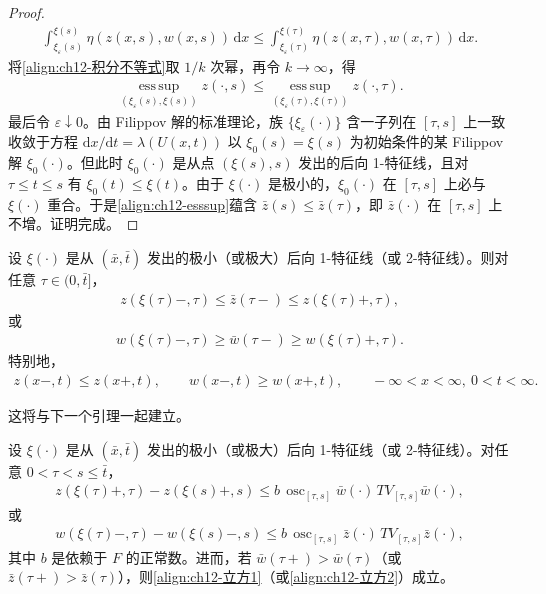 \documentclass[../../main.tex]{subfiles}
\begin{document}
\begin{proof}
\begin{align}
\int_{\xi_\varepsilon(s)}^{\xi(s)}\eta(z(x,s),w(x,s))\,\mathrm{d}x\leqslant\int_{\xi_\varepsilon(\tau)}^{\xi(\tau)}\eta(z(x,\tau),w(x,\tau))\,\mathrm{d}x.
\label{align:ch12-积分不等式}
\end{align}
将\eqref{align:ch12-积分不等式}取 $1/k$ 次幂，再令 $k\to\infty$，得
\begin{align}
\operatorname*{ess\,sup}_{(\xi_\varepsilon(s),\xi(s))}z(\cdot,s)\leqslant\operatorname*{ess\,sup}_{(\xi_\varepsilon(\tau),\xi(\tau))}z(\cdot,\tau).
\label{align:ch12-esssup}
\end{align}
最后令 $\varepsilon\downarrow0$。由 Filippov 解的标准理论，族 $\{\xi_\varepsilon(\cdot)\}$ 含一子列在 $[\tau,s]$ 上一致收敛于方程 $\mathrm{d}x/\mathrm{d}t=\lambda(U(x,t))$ 以 $\xi_0(s)=\xi(s)$ 为初始条件的某 Filippov 解 $\xi_0(\cdot)$。但此时 $\xi_0(\cdot)$ 是从点 $(\xi(s),s)$ 发出的后向 1-特征线，且对 $\tau\leqslant t\leqslant s$ 有 $\xi_0(t)\leqslant\xi(t)$。由于 $\xi(\cdot)$ 是极小的，$\xi_0(\cdot)$ 在 $[\tau,s]$ 上必与 $\xi(\cdot)$ 重合。于是\eqref{align:ch12-esssup}蕴含 $\bar z(s)\leqslant\bar z(\tau)$，即 $\bar z(\cdot)$ 在 $[\tau,s]$ 上不增。证明完成。
\end{proof}

\begin{lemma}\label{lemma:ch12-迹夹逼}
设 $\xi(\cdot)$ 是从 $(\bar x,\bar t)$ 发出的极小（或极大）后向 1-特征线（或 2-特征线）。则对任意 $\tau\in(0,\bar t]$，
\begin{align}
z(\xi(\tau)-,\tau)\leqslant\bar z(\tau-)\leqslant z(\xi(\tau)+,\tau),
\label{align:ch12-夹逼1}
\end{align}
或
\begin{align}
w(\xi(\tau)-,\tau)\geqslant\bar w(\tau-)\geqslant w(\xi(\tau)+,\tau).
\label{align:ch12-夹逼2}
\end{align}
特别地，
\begin{align}
z(x-,t)\leqslant z(x+,t),\qquad w(x-,t)\geqslant w(x+,t),\qquad -\infty<x<\infty,\ 0<t<\infty.
\label{align:ch12-左右极限}
\end{align}
\end{lemma}

这将与下一个引理一起建立。

\begin{lemma}\label{lemma:ch12-振荡估计}
设 $\xi(\cdot)$ 是从 $(\bar x,\bar t)$ 发出的极小（或极大）后向 1-特征线（或 2-特征线）。对任意 $0<\tau<s\leqslant\bar t$，
\begin{align}
z(\xi(\tau)+,\tau)-z(\xi(s)+,s)\leqslant b\,\operatorname{osc}_{[\tau,s]}\bar w(\cdot)\,TV_{[\tau,s]}\bar w(\cdot),
\label{align:ch12-振荡1}
\end{align}
或
\begin{align}
w(\xi(\tau)-,\tau)-w(\xi(s)-,s)\leqslant b\,\operatorname{osc}_{[\tau,s]}\bar z(\cdot)\,TV_{[\tau,s]}\bar z(\cdot),
\label{align:ch12-振荡2}
\end{align}
其中 $b$ 是依赖于 $F$ 的正常数。进而，若 $\bar w(\tau+)>\bar w(\tau)$（或 $\bar z(\tau+)>\bar z(\tau)$），则\eqref{align:ch12-立方1}（或\eqref{align:ch12-立方2}）成立。
\end{lemma}
\end{document}

